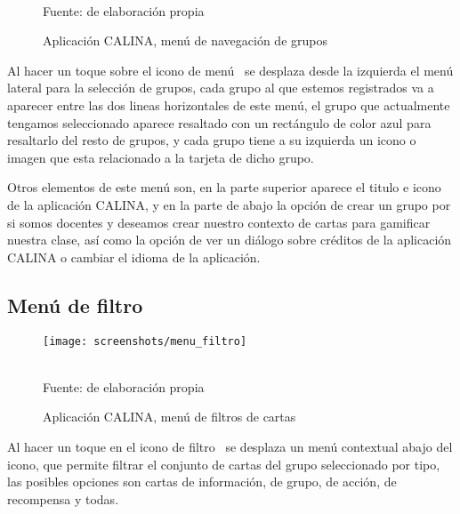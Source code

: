 \begin{figure}[!htb]
\caption[]{Aplicación CALINA, menú de navegación de grupos}
\centering
\begin{adjustbox}{width=5cm}
\end{adjustbox}
\\
{\footnotesize Fuente: de elaboración propia}
\end{figure}

Al hacer un toque sobre el icono de menú \faBars\ se desplaza desde la izquierda el menú lateral para la 
selección de grupos, cada grupo al que estemos registrados va a aparecer entre las dos lineas horizontales de 
este menú, el  grupo que actualmente tengamos seleccionado aparece resaltado con un rectángulo de color azul 
para resaltarlo del resto de grupos, y cada grupo tiene a su izquierda un icono o imagen que esta relacionado 
a la tarjeta de dicho grupo.

Otros elementos de este menú son, en la parte superior aparece el titulo e icono de la aplicación CALINA, y en 
la parte de abajo la opción de crear un grupo por si somos docentes y deseamos crear nuestro contexto de 
cartas para gamificar nuestra clase, así como la opción de ver un diálogo sobre créditos de la aplicación 
CALINA o cambiar el idioma de la aplicación.

\subsection{Menú de filtro}

\begin{figure}[!htb]
\caption[]{Aplicación CALINA, menú de filtros de cartas}
\centering
\begin{adjustbox}{width=5cm}
	\texttt{[image: screenshots/menu\_filtro]}
\end{adjustbox}
\\
{\footnotesize Fuente: de elaboración propia}
\end{figure}

Al hacer un toque en el icono de filtro \faList\ se desplaza un menú contextual abajo del icono, que permite
filtrar el conjunto de cartas del grupo seleccionado por tipo, las posibles opciones son cartas de 
información, de grupo, de acción, de recompensa y todas.


